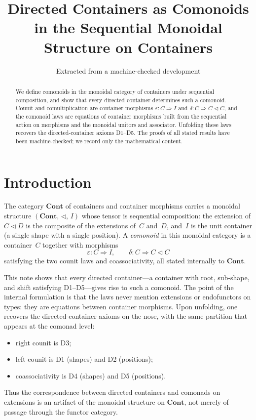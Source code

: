 \documentclass[11pt,a4paper]{article}
\title{Directed Containers as Comonoids\\
  in the Sequential Monoidal Structure on Containers}
\author{Extracted from a machine-checked development}
\date{}
\theoremstyle{plain}
\theoremstyle{definition}
\newcommand{\Cont}{\mathbf{Cont}}
\begin{document}
\maketitle

\begin{abstract}
We define comonoids in the monoidal category of containers under sequential
composition, and show that every directed container determines such a
comonoid. Counit and comultiplication are container morphisms
$\varepsilon : C \Rightarrow I$ and $\delta : C \Rightarrow C \mathbin{\triangleleft} C$,
and the comonoid laws are equations of container morphisms built from the
sequential action on morphisms and the monoidal unitors and associator.
Unfolding these laws recovers the directed-container axioms D1--D5. The proofs
of all stated results have been machine-checked; we record only the
mathematical content.
\end{abstract}

\tableofcontents
\bigskip

\section{Introduction}

The category $\Cont$ of containers and container morphisms carries a monoidal
structure $(\Cont,\, \triangleleft,\, I)$ whose tensor is sequential
composition: the extension of $C \mathbin{\triangleleft} D$ is the composite of
the extensions of~$C$ and~$D$, and~$I$ is the unit container (a single shape
with a single position). A \emph{comonoid} in this monoidal category is a
container~$C$ together with morphisms
\[
  \varepsilon : C \Rightarrow I,
  \qquad
  \delta : C \Rightarrow C \mathbin{\triangleleft} C
\]
satisfying the two counit laws and coassociativity, all stated internally to
$\Cont$.

This note shows that every directed container---a container with root,
sub-shape, and shift satisfying D1--D5---gives rise to such a comonoid. The
point of the internal formulation is that the laws never mention extensions or
endofunctors on types: they are equations between container morphisms. Upon
unfolding, one recovers the directed-container axioms on the nose, with the
same partition that appears at the comonad level:
\begin{itemize}
  \item right counit is D3;
  \item left counit is D1 (shapes) and D2 (positions);
  \item coassociativity is D4 (shapes) and D5 (positions).
\end{itemize}
Thus the correspondence between directed containers and comonads on extensions
is an artifact of the monoidal structure on $\Cont$, not merely of passage
through the functor category.
\end{document}
